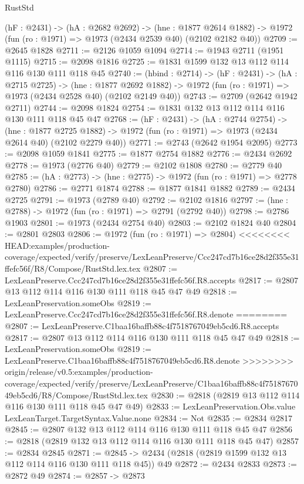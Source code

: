 \begin{lexlean}{RustStd}
\begin{coremodule}
{\begin{coremodule}
  (hF : @2431) ->
  (hA : @2682 @2692) ->
  (hne : @1877 @2614 @1882) -> @1972 (fun (ro : @1971) => @1973 (@2434 @2539 @40) (@2102 @2182 @40))
@2709 := @2645 @1828
@2711 := @2126 @1059 @1094
@2714 := @1943 @2711 (@1951 @1115)
@2715 := @2098 @1816
@2725 := @1831 @1599 @132 @13 @112 @114 @116 @130 @111 @118 @45
@2740 := (hbind : @2714) ->
  (hF : @2431) ->
  (hA : @2715 @2725) ->
  (hne : @1877 @2692 @1882) -> @1972 (fun (ro : @1971) => @1973 (@2434 @2528 @40) (@2102 @2149 @40))
@2743 := @2709 (@2642 @1942 @2711)
@2744 := @2098 @1824
@2754 := @1831 @132 @13 @112 @114 @116 @130 @111 @118 @45 @47
@2768 := (hF : @2431) ->
  (hA : @2744 @2754) ->
  (hne : @1877 @2725 @1882) -> @1972 (fun (ro : @1971) => @1973 (@2434 @2614 @40) (@2102 @2279 @40))
@2771 := @2743 (@2642 @1954 @2095)
@2773 := @2098 @1059 @1841
@2775 := @1877 @2754 @1882
@2776 := @2434 @2692
@2778 := @1973 (@2776 @40)
@2779 := @2102 @1808
@2780 := @2779 @40
@2785 := (hA : @2773) -> (hne : @2775) -> @1972 (fun (ro : @1971) => @2778 @2780)
@2786 := @2771 @1874
@2788 := @1877 @1841 @1882
@2789 := @2434 @2725
@2791 := @1973 (@2789 @40)
@2792 := @2102 @1816
@2797 := (hne : @2788) -> @1972 (fun (ro : @1971) => @2791 (@2792 @40))
@2798 := @2786 @1903
@2801 := @1973 (@2434 @2754 @40)
@2803 := @2102 @1824 @40
@2804 := @2801 @2803
@2806 := @1972 (fun (ro : @1971) => @2804)
<<<<<<<< HEAD:examples/production-coverage/expected/verify/preserve/LexLeanPreserve/Ccc247cd7b16ce28d2f355e31ffefc56f/R8/Compose/RustStd.lex.tex
@2807 := LexLeanPreserve.Ccc247cd7b16ce28d2f355e31ffefc56f.R8.accepts
@2817 := @2807 @13 @112 @114 @116 @130 @111 @118 @45 @47 @49
@2818 := LexLeanPreservation.someObs
@2819 := LexLeanPreserve.Ccc247cd7b16ce28d2f355e31ffefc56f.R8.denote
========
@2807 := LexLeanPreserve.C1baa16baffb88c4f7518767049eb5cd6.R8.accepts
@2817 := @2807 @13 @112 @114 @116 @130 @111 @118 @45 @47 @49
@2818 := LexLeanPreservation.someObs
@2819 := LexLeanPreserve.C1baa16baffb88c4f7518767049eb5cd6.R8.denote
>>>>>>>> origin/release/v0.5:examples/production-coverage/expected/verify/preserve/LexLeanPreserve/C1baa16baffb88c4f7518767049eb5cd6/R8/Compose/RustStd.lex.tex
@2830 := @2818 (@2819 @13 @112 @114 @116 @130 @111 @118 @45 @47 @49)
@2833 := LexLeanPreservation.Obs.value LexLeanTarget.TargetSyntax.Value.none
@2834 := Not
@2835 := @2834 @2817
@2845 := @2807 @132 @13 @112 @114 @116 @130 @111 @118 @45 @47
@2856 := @2818 (@2819 @132 @13 @112 @114 @116 @130 @111 @118 @45 @47)
@2857 := @2834 @2845
@2871 := @2845 -> @2434 (@2818 (@2819 @1599 @132 @13 @112 @114 @116 @130 @111 @118 @45)) @49
@2872 := @2434 @2833
@2873 := @2872 @49
@2874 := @2857 -> @2873

\end{coremodule}}
\end{coremodule}
\end{lexlean}
